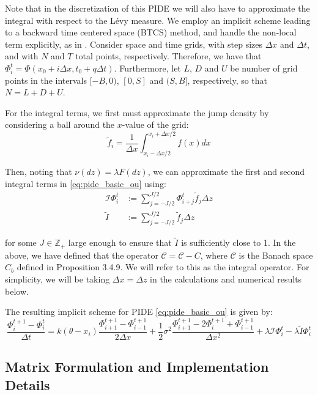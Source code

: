 \documentclass[11pt,twoside,openright]{report}
\begin{document}
Note that in the discretization of this PIDE we will also have to approximate the integral with respect to the Lévy measure. We employ an implicit scheme leading to a backward time centered space (BTCS) method, and handle the non-local term explicitly, as in \cite{cont2005finite}. Consider space and time grids, with step sizes $\Delta x$ and $\Delta t$, and with $N$ and $T$ total points, respectively. Therefore, we have that $\Phi^t_i = \Phi(x_0 + i\Delta x, t_0 + q\Delta t)$. Furthermore, let $L$, $D$ and $U$ be number of grid points in the intervals $[-B, 0)$, $[0, S]$ and $(S, B]$, respectively, so that $N = L + D + U$.

For the integral terms, we first must approximate the jump density by considering a ball around the $x$-value of the grid:
\begin{equation}
\tilde{f}_i = \frac{1}{\Delta x} \int_{x_i - \Delta x/2}^{x_i + \Delta x/2} f(x) dx
\label{eq:jump_density_approximation}
\end{equation}

Then, noting that $\nu(dz) = \lambda F(dz)$, we can approximate the first and second integral terms in \eqref{eq:pide_basic_ou} using:
\begin{align}
\mathcal{I}\Phi^t_i &:= \sum_{j=-J/2}^{J/2} \Phi^t_{i+j} \tilde{f}_j \Delta z \label{eq:integral_approximation_1} \\
\tilde{I} &:= \sum_{j=-J/2}^{J/2} \tilde{f}_j \Delta z \label{eq:integral_approximation_2}
\end{align}

for some $J \in \mathbb{Z}_+$ large enough to ensure that $\tilde{I}$ is sufficiently close to 1. In the above, we have defined that the operator $\mathcal{C} = \mathcal{C} - C$, where $\mathcal{C}$ is the Banach space $C_b$ defined in Proposition 3.4.9. We will refer to this as the integral operator. For simplicity, we will be taking $\Delta x = \Delta z$ in the calculations and numerical results below.

The resulting implicit scheme for PIDE \eqref{eq:pide_basic_ou} is given by:
\begin{equation}
\frac{\Phi^{t+1}_i - \Phi^t_i}{\Delta t} = k(\theta - x_i)\frac{\Phi^{t+1}_{i+1} - \Phi^{t+1}_{i-1}}{2\Delta x} + \frac{1}{2}\sigma^2 \frac{\Phi^{t+1}_{i+1} - 2\Phi^{t+1}_i + \Phi^{t+1}_{i-1}}{\Delta x^2} + \lambda\mathcal{I}\Phi^t_i - \lambda\tilde{I}\Phi^t_i
\label{eq:implicit_scheme}
\end{equation}

\subsection{Matrix Formulation and Implementation Details}
\end{document}
